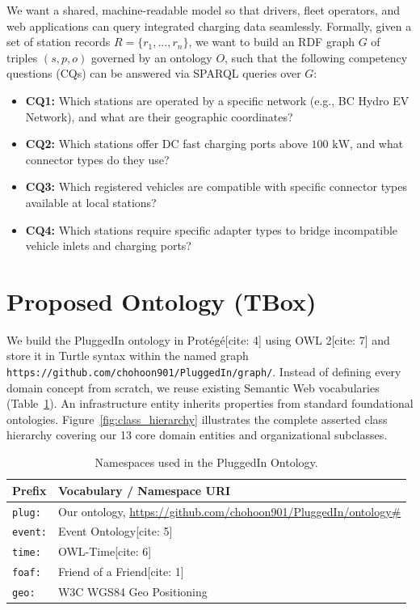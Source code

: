 \documentclass[sigconf]{acmart}
\begin{document}
We want a shared, machine-readable model so that drivers, fleet operators, and web applications can query integrated charging data seamlessly. Formally, given a set of station records $R=\{r_{1},...,r_{n}\}$, we want to build an RDF graph $G$ of triples $(s, p, o)$ governed by an ontology $O$, such that the following competency questions (CQs) can be answered via SPARQL queries over $G$:
\begin{itemize}
    \setlength\itemsep{0pt}
    \item \textbf{CQ1:} Which stations are operated by a specific network (e.g., BC Hydro EV Network), and what are their geographic coordinates?
    \item \textbf{CQ2:} Which stations offer DC fast charging ports above $100\text{ kW}$, and what connector types do they use?
    \item \textbf{CQ3:} Which registered vehicles are compatible with specific connector types available at local stations?
    \item \textbf{CQ4:} Which stations require specific adapter types to bridge incompatible vehicle inlets and charging ports?
\end{itemize}

\section{Proposed Ontology (TBox)}
We build the PluggedIn ontology in Protégé[cite: 4] using OWL 2[cite: 7] and store it in Turtle syntax within the named graph \texttt{https://github.com/chohoon901/PluggedIn/graph/}. Instead of defining every domain concept from scratch, we reuse existing Semantic Web vocabularies (Table~\ref{tab:namespaces}). An infrastructure entity inherits properties from standard foundational ontologies. Figure~\ref{fig:class_hierarchy} illustrates the complete asserted class hierarchy covering our 13 core domain entities and organizational subclasses.

\begin{table}[h]
\centering
\small
\caption{Namespaces used in the PluggedIn Ontology.}
\label{tab:namespaces}
\begin{tabular}{ll}
\toprule
\textbf{Prefix} & \textbf{Vocabulary / Namespace URI} \\
\midrule
\texttt{plug:} & Our ontology, \url{https://github.com/chohoon901/PluggedIn/ontology\#} \\
\texttt{event:} & Event Ontology[cite: 5] \\
\texttt{time:} & OWL-Time[cite: 6] \\
\texttt{foaf:} & Friend of a Friend[cite: 1] \\
\texttt{geo:} & W3C WGS84 Geo Positioning \\
\bottomrule
\end{tabular}
\end{table}
\end{document}
